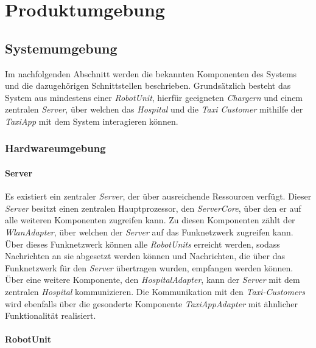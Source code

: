 \section{Produktumgebung}

  \subsection{Systemumgebung}
  Im nachfolgenden Abschnitt werden die bekannten Komponenten des Systems und die dazugehörigen Schnittstellen beschrieben.
  Grundsätzlich besteht das System aus mindestens einer \emph{RobotUnit}, hierfür geeigneten \emph{Chargern} und einem zentralen \emph{Server}, über welchen das \emph{Hospital} und die \emph{Taxi Customer} mithilfe der \emph{TaxiApp} mit dem System interagieren können.

  \subsubsection{Hardwareumgebung}

    \paragraph{Server}\label{server}

    Es existiert ein zentraler \emph{Server}, der über ausreichende Ressourcen verfügt.
    Dieser \emph{Server} besitzt einen zentralen Hauptprozessor, den \emph{ServerCore}, über den er auf alle weiteren Komponenten zugreifen kann.
    Zu diesen Komponenten zählt der \emph{WlanAdapter}, über welchen der \emph{Server} auf das Funknetzwerk zugreifen kann.
    Über dieses Funknetzwerk können alle \emph{RobotUnits} erreicht werden, sodass Nachrichten an sie abgesetzt werden können und Nachrichten, die über das Funknetzwerk für den \emph{Server} übertragen wurden, empfangen werden können.
    Über eine weitere Komponente, den \emph{HospitalAdapter}, kann der \emph{Server} mit dem zentralen \emph{Hospital} kommunizieren.
    Die Kommunikation mit den \emph{Taxi-Customers} wird ebenfalls über die gesonderte Komponente \emph{TaxiAppAdapter} mit ähnlicher Funktionalität realisiert.

    \paragraph{RobotUnit}\label{robotunit}

